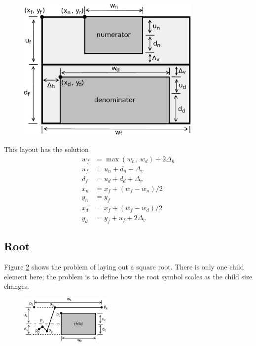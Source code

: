 \documentclass[12pt]{article}
\begin{document}
\begin{figure}[ht]
	\centering
		\includegraphics[width=0.8\textwidth]{Fig/LayoutFraction.pdf}
	\caption{}
	\label{fig:layout_fraction}
\end{figure}

This layout has the solution
\begin{align*}
w_f &= \max(w_n, \; w_d) + 2\Delta_h \\
u_f &= u_n + d_n + \Delta_v \\
d_f &= u_d + d_d + \Delta_v \\
x_n &= x_f + (w_f - w_n)/2 \\
y_n &= y_f \\
x_d &= x_f + (w_f - w_d)/2 \\
y_d &= y_f + u_f + 2\Delta_v
\end{align*}

\subsection{Root}

Figure \ref{fig:layout_root} shows the problem of laying out a square root. There is only one child element here; the problem is to define how the root symbol scales as the child size changes.

\begin{figure}[ht]
	\centering
		\includegraphics[width=0.4\textwidth]{Fig/LayoutRoot.pdf}
	\caption{}
	\label{fig:layout_root}
\end{figure}
\end{document}
